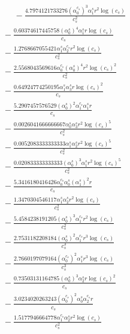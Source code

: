 \documentclass[10pt]{article}
\begin{document}
\begin{align*}
\phantom{R_{1,7}} &\phantom{={}}{}  - \frac{4.7974121733276 \left(\alpha_{0}^{c_s}\right)^{3} \alpha_{1}^s r^{2} \log{\left(c_{s} \right)}}{c_{s}^{2}} \\
&{}  - \frac{0.60374617445758 \left(\alpha_{0}^s\right)^{4} \alpha_{1}^s r \log{\left(c_{s} \right)}}{c_{s}} \\
&{}  - \frac{1.2768667055421 \alpha_{1}^s \alpha_{2}^{c_s} r^{2} \log{\left(c_{s} \right)}}{c_{s}^{2}} \\
&{}  - \frac{2.5568043569616 \alpha_{0}^{c_s} \left(\alpha_{0}^s\right)^{4} r^{2} \log{\left(c_{s} \right)}^{2}}{c_{s}^{2}} \\
&{}  - \frac{0.64924774250195 \alpha_{1}^s \alpha_{3}^s r \log{\left(c_{s} \right)}^{2}}{c_{s}} \\
&{}  - \frac{5.2907457576529 \left(\alpha_{0}^s\right)^{2} \alpha_{1}^{c_s} \alpha_{1}^s r}{c_{s}} \\
&{}  - \frac{0.0026041666666667 \alpha_{0}^s \alpha_{3}^s r^{2} \log{\left(c_{s} \right)}^{5}}{c_{s}^{2}} \\
&{}  - \frac{0.0052083333333333 \alpha_{1}^s \alpha_{2}^s r^{2} \log{\left(c_{s} \right)}^{5}}{c_{s}^{2}} \\
&{}  - \frac{0.020833333333333 \left(\alpha_{0}^s\right)^{3} \alpha_{1}^s r^{2} \log{\left(c_{s} \right)}^{5}}{c_{s}^{2}} \\
&{}  - \frac{5.3416180416426 \alpha_{0}^{c_s} \alpha_{0}^s \left(\alpha_{1}^s\right)^{2} r}{c_{s}} \\
&{}  - \frac{1.3470304546117 \alpha_{1}^s \alpha_{2}^s r^{2} \log{\left(c_{s} \right)}}{c_{s}^{2}} \\
&{}  - \frac{5.4584238191205 \left(\alpha_{0}^s\right)^{3} \alpha_{1}^{c_s} r^{2} \log{\left(c_{s} \right)}}{c_{s}^{2}} \\
&{}  - \frac{2.7531182208184 \left(\alpha_{0}^s\right)^{2} \alpha_{1}^{c_s} r^{3} \log{\left(c_{s} \right)}}{c_{s}^{3}} \\
&{}  - \frac{2.7660197079164 \left(\alpha_{0}^{c_s}\right)^{2} \alpha_{1}^s r^{3} \log{\left(c_{s} \right)}}{c_{s}^{3}} \\
&{}  - \frac{0.73503131164785 \left(\alpha_{0}^s\right)^{3} \alpha_{2}^s r \log{\left(c_{s} \right)}^{2}}{c_{s}} \\
&{}  - \frac{3.0234020263243 \left(\alpha_{0}^{c_s}\right)^{2} \alpha_{0}^s \alpha_{2}^{c_s} r}{c_{s}} \\
&{}  - \frac{1.5177946664778 \alpha_{1}^{c_s} \alpha_{2}^s r^{2} \log{\left(c_{s} \right)}}{c_{s}^{2}} \\

\end{align*}
\end{document}
